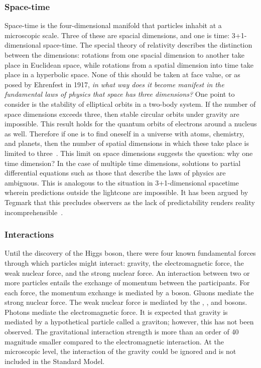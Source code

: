 \subsubsection{Space-time}

Space-time is the four-dimensional manifold that particles inhabit at a microscopic scale.
Three of these are spacial dimensions, and one is time: 3+1-dimensional space-time. 
The special theory of relativity describes the distinction between the dimensions: rotations from one spacial dimension to another take place in Euclidean space, while rotations from a spatial dimension into time take place in a hyperbolic space.
None of this should be taken at face value, or as posed by Ehrenfest in 1917, \emph{in what way does it become manifest in the fundamental laws of physics that space has three dimensions?} 
One point to consider is the stability of elliptical orbits in a two-body system.
If the number of space dimensions exceeds three, then stable circular orbits under gravity are impossible.
This result holds for the quantum orbits of electrons around a nucleus as well. 
Therefore if one is to find oneself in a universe with atoms, chemistry, and planets, then the number of spatial dimensions in which these take place is limited to three~\cite{ehrenfest}.
This limit on space dimensions suggests the question: why one time dimension?
In the case of multiple time dimensions, solutions to partial differential equations such as those that describe the laws of physics are ambiguous.
This is analogous to the situation in 3+1-dimensional spacetime wherein predictions outside the lightcone are impossible.
It has been argued by Tegmark that this precludes observers as the lack of predictability renders reality incomprehensible~\cite{tegmark-time}.


\subsubsection{Interactions}
Until the discovery of the Higgs boson, there were four known fundamental forces through which particles might interact: gravity, the electromagnetic force, the weak nuclear force, and the strong nuclear force.
An interaction between two or more particles entails the exchange of momentum between the participants.
For each force, the momentum exchange is mediated by a boson.
Gluons mediate the strong nuclear force.
The weak nuclear force is mediated by the \Wp, \Wm, and \Z bosons.
Photons mediate the electromagnetic force.
It is expected that gravity is mediated by a hypothetical particle called a graviton; however, this has not been observed. The gravitational interaction strength is more than an order of 40 magnitude smaller compared to the electromagnetic interaction. At the microscopic level, the interaction of the gravity could be ignored and is not included in the Standard Model.

